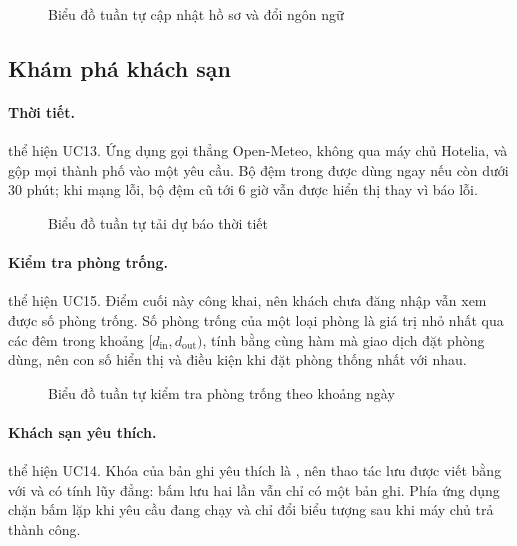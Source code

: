 \begin{figure}[H]
\centering
{}
\caption{Biểu đồ tuần tự cập nhật hồ sơ và đổi ngôn ngữ}\label{fig:seq-profile}
\end{figure}

\subsection{Khám phá khách sạn}

\paragraph{Thời tiết.}  thể hiện UC13. Ứng dụng gọi thẳng Open-Meteo, không qua máy chủ Hotelia, và gộp mọi thành phố vào một yêu cầu. Bộ đệm trong  được dùng ngay nếu còn dưới 30 phút; khi mạng lỗi, bộ đệm cũ tới 6 giờ vẫn được hiển thị thay vì báo lỗi.

\begin{figure}[H]
\centering
{}
\caption{Biểu đồ tuần tự tải dự báo thời tiết}\label{fig:seq-weather}
\end{figure}

\paragraph{Kiểm tra phòng trống.}  thể hiện UC15. Điểm cuối này công khai, nên khách chưa đăng nhập vẫn xem được số phòng trống. Số phòng trống của một loại phòng là giá trị nhỏ nhất qua các đêm trong khoảng $[d_{\text{in}}, d_{\text{out}})$, tính bằng cùng hàm  mà giao dịch đặt phòng dùng, nên con số hiển thị và điều kiện khi đặt phòng thống nhất với nhau.

\begin{figure}[H]
\centering
{}
\caption{Biểu đồ tuần tự kiểm tra phòng trống theo khoảng ngày}\label{fig:seq-availability}
\end{figure}

\paragraph{Khách sạn yêu thích.}  thể hiện UC14. Khóa của bản ghi yêu thích là , nên thao tác lưu được viết bằng  với  và có tính lũy đẳng: bấm lưu hai lần vẫn chỉ có một bản ghi. Phía ứng dụng chặn bấm lặp khi yêu cầu đang chạy và chỉ đổi biểu tượng sau khi máy chủ trả thành công.

